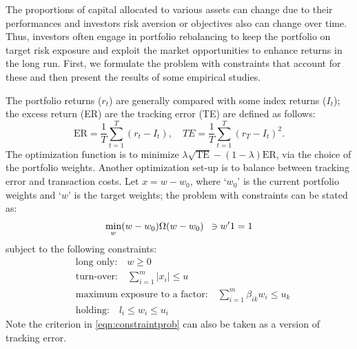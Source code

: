 The proportions of capital allocated to various assets can change due to their performances and investors risk aversion or objectives also can change over time. Thus, investors often engage in portfolio rebalancing to keep the portfolio on target risk exposure and exploit the market opportunities to enhance returns in the long run. First, we formulate the problem with constraints that account for these and then present the results of some empirical studies.


The portfolio returns ($r_t$) are generally compared with some index returns ($I_t$); the excess return (ER) are the tracking error (TE) are defined as follows:
	\begin{equation} \label{eqn:excesstrack}
	\text{ER}= \dfrac{1}{T} \sum_{t=1}^T (r_t - I_t), \quad TE= \dfrac{1}{T} \sum_{t=1}^T (r_T - I_t)^2.
	\end{equation}
The optimization function is to minimize $\lambda \sqrt{\text{TE}} - (1 - \lambda) \text{ER}$, via the choice of the portfolio weights. Another optimization set-up is to balance between tracking error and transaction costs. Let $x= w - w_0$, where `$w_0$' is the current portfolio weights and `$w$' is the target weights; the problem with constraints can be stated as:
	\begin{equation} \label{eqn:constraintprob}
	\min_w (w - w_0) \Omega (w-w_0) \enskip \ni w'1= 1
	\end{equation}
subject to the following constraints:
	\begin{equation} \label{eqn:constraintlist}
	\begin{split}
	&\text{long only:} \quad w \geq 0 \\
	&\text{turn-over:} \quad \sum_{i=1}^m |x_i| \leq u \\
	&\text{maximum exposure to a factor:} \quad \sum_{i=1}^m \beta_{ik} w_i \leq u_k \\
	&\text{holding:} \quad l_i \leq w_i \leq u_i
	\end{split}
	\end{equation}
Note the criterion in \eqref{eqn:constraintprob} can also be taken as a version of tracking error. 


